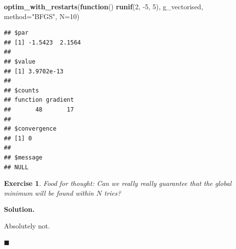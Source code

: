 \documentclass[10pt,b5paper,krantz1]{krantz}
\newenvironment{Shaded}{\begin{snugshade}}{\end{snugshade}}
\newcommand{\CommentTok}[1]{\textcolor[rgb]{0.37,0.37,0.37}{\textit{#1}}}
\newcommand{\ControlFlowTok}[1]{\textcolor[rgb]{0.27,0.27,0.27}{\textbf{#1}}}
\newcommand{\DataTypeTok}[1]{\textcolor[rgb]{0.27,0.27,0.27}{#1}}
\newcommand{\DecValTok}[1]{\textcolor[rgb]{0.06,0.06,0.06}{#1}}
\newcommand{\KeywordTok}[1]{\textcolor[rgb]{0.27,0.27,0.27}{\textbf{#1}}}
\newcommand{\NormalTok}[1]{#1}
\newcommand{\OperatorTok}[1]{\textcolor[rgb]{0.43,0.43,0.43}{\textbf{#1}}}
\newcommand{\OtherTok}[1]{\textcolor[rgb]{0.37,0.37,0.37}{#1}}
\newcommand{\StringTok}[1]{\textcolor[rgb]{0.5,0.5,0.5}{#1}}
\newtheorem{exercise}{Exercise}[chapter]
\newenvironment{solution}{%
\bigskip\noindent\textbf{Solution. }%
\it\ignorespaces%
\ignorespaces%
}{\ignorespaces%
\hfill$\blacksquare$%
}
\begin{document}
\begin{Shaded}
\end{Shaded}

\begin{Shaded}
\begin{Highlighting}[]
\KeywordTok{optim_with_restarts}\NormalTok{(}\ControlFlowTok{function}\NormalTok{() }\KeywordTok{runif}\NormalTok{(}\DecValTok{2}\NormalTok{, }\DecValTok{-5}\NormalTok{, }\DecValTok{5}\NormalTok{),}
\NormalTok{    g_vectorised, }\DataTypeTok{method=}\StringTok{"BFGS"}\NormalTok{, }\DataTypeTok{N=}\DecValTok{10}\NormalTok{)}
\end{Highlighting}
\end{Shaded}

\begin{verbatim}
## $par
## [1] -1.5423  2.1564
## 
## $value
## [1] 3.9702e-13
## 
## $counts
## function gradient 
##       48       17 
## 
## $convergence
## [1] 0
## 
## $message
## NULL
\end{verbatim}

\begin{exercise}

Food for thought:
Can we really really guarantee that the global minimum will be found within \(N\) tries?

\end{exercise}

\begin{solution}

Absolutely not.

\end{solution}
\end{document}
